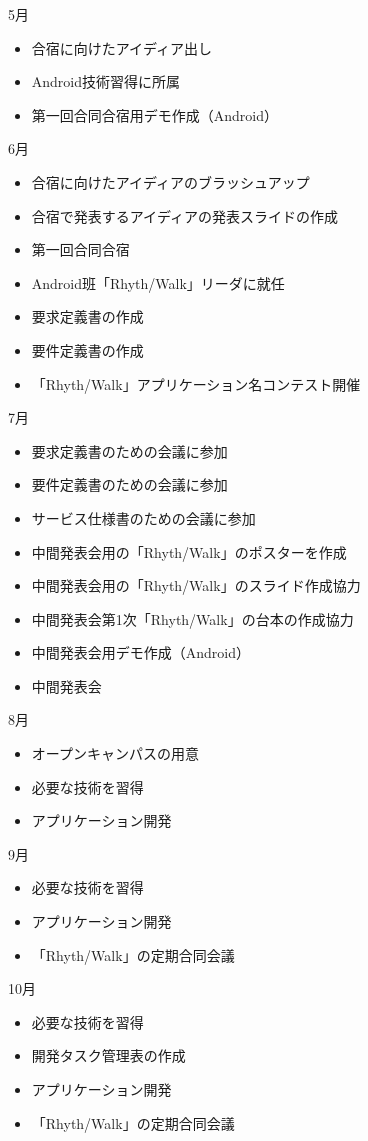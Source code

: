 5月
\begin{itemize}
\item 合宿に向けたアイディア出し
\item Android技術習得に所属　
\item 第一回合同合宿用デモ作成（Android）
\end{itemize}
6月
\begin{itemize}
\item 合宿に向けたアイディアのブラッシュアップ
\item 合宿で発表するアイディアの発表スライドの作成
\item 第一回合同合宿
\item Android班「Rhyth/Walk」リーダに就任
\item 要求定義書の作成
\item 要件定義書の作成
\item 「Rhyth/Walk」アプリケーション名コンテスト開催
\end{itemize}
7月
\begin{itemize}
\item 要求定義書のための会議に参加
\item 要件定義書のための会議に参加
\item サービス仕様書のための会議に参加
\item 中間発表会用の「Rhyth/Walk」のポスターを作成　
\item 中間発表会用の「Rhyth/Walk」のスライド作成協力
\item 中間発表会第1次「Rhyth/Walk」の台本の作成協力
\item 中間発表会用デモ作成（Android）
\item 中間発表会
\end{itemize}
8月
\begin{itemize}
\item オープンキャンパスの用意
\item 必要な技術を習得
\item アプリケーション開発
\end{itemize}
9月
\begin{itemize}
\item 必要な技術を習得
\item アプリケーション開発
\item 「Rhyth/Walk」の定期合同会議
\end{itemize}
10月
\begin{itemize}
\item 必要な技術を習得
\item 開発タスク管理表の作成
\item アプリケーション開発
\item 「Rhyth/Walk」の定期合同会議
\end{itemize}
